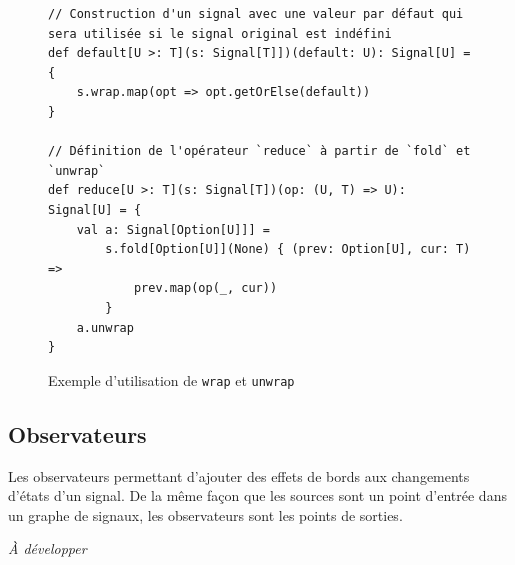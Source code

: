 \begin{figure}[h]
	\begin{lstlisting}
// Construction d'un signal avec une valeur par défaut qui sera utilisée si le signal original est indéfini
def default[U >: T](s: Signal[T]])(default: U): Signal[U] = {
	s.wrap.map(opt => opt.getOrElse(default))
}
	
// Définition de l'opérateur `reduce` à partir de `fold` et `unwrap`
def reduce[U >: T](s: Signal[T])(op: (U, T) => U): Signal[U] = {
	val a: Signal[Option[U]]] =
		s.fold[Option[U]](None) { (prev: Option[U], cur: T) =>
			prev.map(op(_, cur))
		}
	a.unwrap
}
	\end{lstlisting}
	\caption{Exemple d'utilisation de \texttt{wrap} et \texttt{unwrap}}
\end{figure}

\subsection{Observateurs} \label{sec:sig-obs}

Les observateurs permettant d'ajouter des effets de bords aux changements d'états d'un signal. De la même façon que les sources sont un point d'entrée dans un graphe de signaux, les observateurs sont les points de sorties.

\textit{À développer}